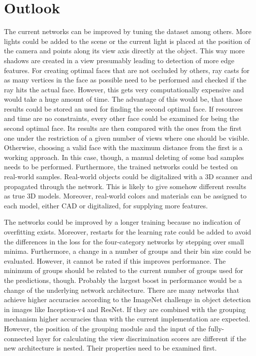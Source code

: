 \section{Outlook}
\label{sec:discussion-outlook}
The current networks can be improved by tuning the dataset among others.
More lights could be added to the scene or the current light is placed at the position of the camera and points along its view axis directly at the object.
This way more shadows are created in a view presumably leading to detection of more edge features.
For creating optimal faces that are not occluded by others, ray casts for as many vertices in the face as possible need to be performed and checked if the ray hits the actual face.
However, this gets very computationally expensive and would take a huge amount of time.
The advantage of this would be, that those results could be stored an used for finding the second optimal face.
If resources and time are no constraints, every other face could be examined for being the second optimal face.
Its results are then compared with the ones from the first one under the restriction of a given number of views where one should be visible.
Otherwise, choosing a valid face with the maximum distance from the first is a working approach.
In this case, though, a manual deleting of some bad samples needs to be performed.
Furthermore, the trained networks could be tested on real-world samples.
Real-world objects could be digitalized with a 3D scanner and propagated through the network.
This is likely to give somehow different results as true 3D models.
Moreover, real-world colors and materials can be assigned to each model, either CAD or digitalized, for supplying more features.

The networks could be improved by a longer training because no indication of overfitting exists.
Moreover, restarts for the learning rate could be added to avoid the differences in the loss for the four-category networks by stepping over small minima.
Furthermore, a change in a number of groups and their bin size could be evaluated.
However, it cannot be rated if this improves performance.
The minimum of groups should be related to the current number of groups used for the predictions, though.
Probably the largest boost in performance would be a change of the underlying network architecture.
There are many networks that achieve higher accuracies according to the ImageNet challenge in object detection in images like Inception-v4 and ResNet.
If they are combined with the grouping mechanism higher accuracies than with the current implementation are expected.
However, the position of the grouping module and the input of the fully-connected layer for calculating the view discrimination scores are different if the new architecture is nested.
Their properties need to be examined first.